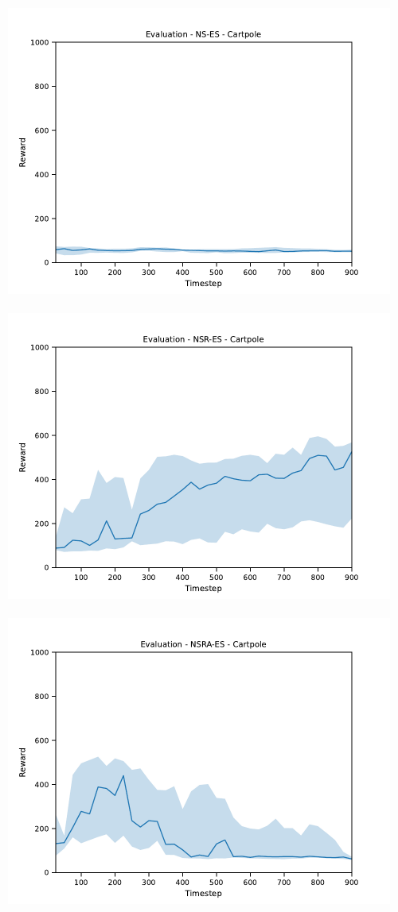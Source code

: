 \begin{figure}[H]
    \includegraphics[width=0.9\textwidth]{img/eval-cart-nses.pdf}
\end{figure}
\begin{figure}[H]
    \includegraphics[width=0.9\textwidth]{img/eval-cart-nsres.pdf}
\end{figure}
\begin{figure}[H]
    \includegraphics[width=0.9\textwidth]{img/eval-cart-nsraes.pdf}
\end{figure}
